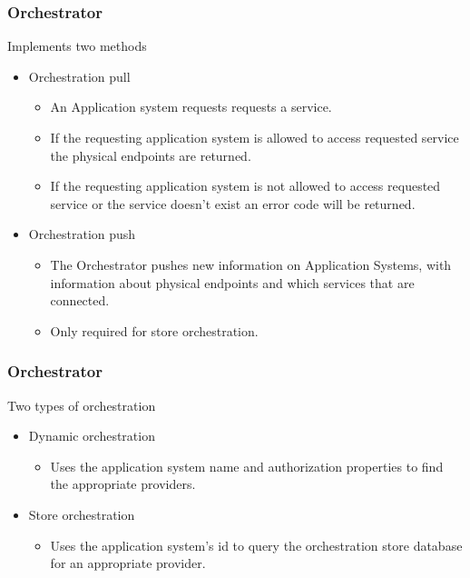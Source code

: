 \begin{frame}  
    \frametitle{Orchestrator}
    Implements two methods
    \begin{itemize}
        \item Orchestration pull
            \begin{itemize}
                \item An Application system requests requests a service.
                \item If the requesting application system is allowed to access requested service the 
                      physical endpoints are returned.
                \item If the requesting application system is not allowed to access requested service or the        service doesn't exist an error code will be returned.
            \end{itemize}
        \item Orchestration push
        \begin{itemize}
            \item The Orchestrator pushes new information on Application Systems, with information about physical endpoints and which services that are connected.
            \item Only required for store orchestration.
        \end{itemize}
        
    \end{itemize}

\end{frame}

\begin{frame}
    \frametitle{Orchestrator}
    Two types of orchestration 
    \begin{itemize}
        \item Dynamic orchestration
        \begin{itemize}
            \item Uses the application system name and authorization properties to find the appropriate providers. 
        \end{itemize}
        
        \item Store orchestration
        \begin{itemize}
            \item Uses the application system's id to query the orchestration store database for an appropriate provider. 
        \end{itemize}
    \end{itemize}

\end{frame}